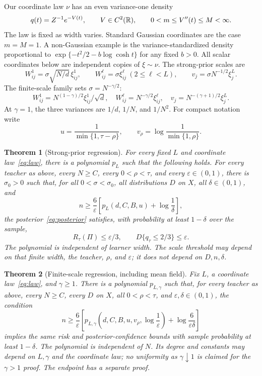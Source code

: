 \documentclass[11pt]{article}
\newtheorem{theorem}{Theorem}[section]\newtheorem{proposition}[theorem]{Proposition}
\theoremstyle{remark}\newtheorem{remark}[theorem]{Remark}
\begin{document}
Our coordinate law $\nu$ has an even variance-one density
\begin{equation}\label{eq:law}
 q(t)=Z^{-1}e^{-V(t)},\qquad V\in C^2(\mathbb R),\qquad
 0<m\leq V''(t)\leq M<\infty.
\end{equation}
The law is fixed as width varies. Standard Gaussian coordinates are the
case $m=M=1$. A non-Gaussian example is the variance-standardized density
proportional to $\exp\{-t^2/2-b\log\cosh t\}$ for any fixed $b>0$.
All scalar coordinates below are independent copies of $\xi\sim\nu$.
The strong-prior scales are
\begin{equation}\label{eq:strong-scales}
 W^1_{ij}=\sigma\sqrt{N/d}\,\xi^1_{ij},\qquad
 W^\ell_{ij}=\sigma\xi^\ell_{ij}\ (2\leq\ell<L),\qquad
 v_j=\sigma N^{-1/2}\xi^L_j.
\end{equation}
The finite-scale family sets $\sigma=N^{-\gamma/2}$:
\begin{equation}\label{eq:finite-scales}
 W^1_{ij}=N^{(1-\gamma)/2}\xi^1_{ij}/\sqrt d,\quad
 W^\ell_{ij}=N^{-\gamma/2}\xi^\ell_{ij},\quad
 v_j=N^{-(\gamma+1)/2}\xi^L_j.
\end{equation}
At $\gamma=1$, the three variances are $1/d$, $1/N$, and $1/N^2$.
For compact notation write
\[
 u=\frac1{\min\{1,\tau-\rho\}},\qquad
 v_\rho=\log\frac1{\min\{1,\rho\}}.
\]

\begin{theorem}[Strong-prior regression]\label{thm:strong}
For every fixed $L$ and coordinate law~\eqref{eq:law}, there is a
polynomial $p_L$ such that the following holds. For every teacher as above,
every $N\geq C$, every $0<\rho<\tau$, and every $\varepsilon\in(0,1)$,
there is $\sigma_0>0$ such that, for all $0<\sigma<\sigma_0$, all
distributions $D$ on $X$, all $\delta\in(0,1)$, and
\[
 n\geq\frac6\varepsilon
 \left[p_L(d,C,B,u)+\log\frac1\delta\right],
\]
the posterior~\eqref{eq:posterior} satisfies, with probability at least
$1-\delta$ over the sample,
\[
 R_\tau(\Pi)\leq\varepsilon/3,\qquad
 D\{q_\tau\leq2/3\}\leq\varepsilon.
\]
The polynomial is independent of learner width. The scale threshold may
depend on that finite width, the teacher, $\rho$, and $\varepsilon$;
it does not depend on $D,n,\delta$.
\end{theorem}

\begin{theorem}[Finite-scale regression, including mean field]
\label{thm:finite}
Fix $L$, a coordinate law~\eqref{eq:law}, and $\gamma\geq1$.
There is a polynomial $p_{L,\gamma}$ such that, for every teacher as above,
every $N\geq C$, every $D$ on $X$, all $0<\rho<\tau$, and
$\varepsilon,\delta\in(0,1)$, the condition
\begin{equation}\label{eq:finite-samples}
 n\geq\frac6\varepsilon\left[
 p_{L,\gamma}\!\left(d,C,B,u,v_\rho,\log\frac1\varepsilon\right)
 +\log\frac6{\varepsilon\delta}\right]
\end{equation}
implies the same risk and posterior-confidence bounds with sample
probability at least $1-\delta$.
The polynomial is independent of $N$. Its degree and constants may depend
on $L,\gamma$ and the coordinate law; no uniformity as
$\gamma\downarrow1$ is claimed for the $\gamma>1$ proof.
The endpoint has a separate proof.
\end{theorem}
\end{document}
